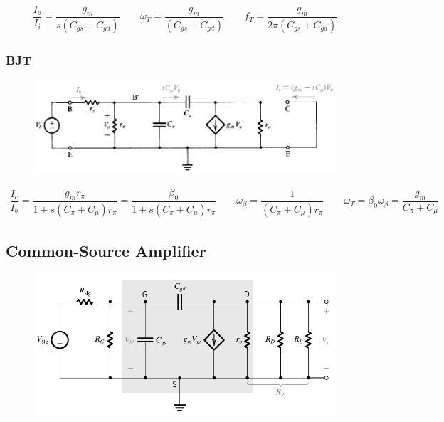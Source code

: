 \begin{equation*}
  \begin{aligned}
    \dfrac{I_o}{I_i} = \dfrac{g_m}{s \left( C_{gs} + C_{gd} \right)}  \quad\quad \omega_T = \dfrac{g_m}{\left( C_{gs} + C_{gd} \right)} \quad\quad f_T = \dfrac{g_m}{2 \pi \left( C_{gs} + C_{gd} \right)} 
  \end{aligned}
\end{equation*}

\subsubsection{BJT}

\begin{figure}[H]
  \centering
  \includegraphics[width=0.7\linewidth]{figures/Frequency-Response-UG-BJT}
  \label{fig:}
\end{figure}

\begin{equation*}
  \begin{aligned}
    \dfrac{I_c}{I_b} = \dfrac{g_m r_{\pi}}{1 + s \left( C_{\pi} + C_{\mu} \right) r_{\pi}} = \dfrac{\beta_0}{1 + s \left( C_{\pi} + C_{\mu} \right) r_{\pi}} \quad\quad \omega_{\beta} = \dfrac{1}{\left( C_{\pi} + C_{\mu} \right) r_{\pi}} \quad\quad \omega_T = \beta_0 \omega_{\beta} = \dfrac{g_m}{C_{\pi} + C_{\mu}}     
  \end{aligned}
\end{equation*}

\subsection{Common-Source Amplifier}

\begin{figure}[H]
  \centering
  \includegraphics[width=0.9\linewidth]{figures/Frequency-Response-CS-High-1}
  \label{fig:}
\end{figure}


